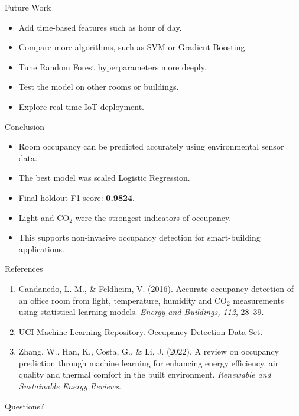 \documentclass[aspectratio=169,11pt]{beamer}
\begin{document}
\begin{frame}{Future Work}
    \begin{itemize}
        \item Add time-based features such as hour of day.
        \item Compare more algorithms, such as SVM or Gradient Boosting.
        \item Tune Random Forest hyperparameters more deeply.
        \item Test the model on other rooms or buildings.
        \item Explore real-time IoT deployment.
    \end{itemize}
\end{frame}

\begin{frame}{Conclusion}
    \begin{itemize}
        \item Room occupancy can be predicted accurately using environmental sensor data.
        \item The best model was scaled Logistic Regression.
        \item Final holdout F1 score: \textbf{0.9824}.
        \item Light and CO$_2$ were the strongest indicators of occupancy.
        \item This supports non-invasive occupancy detection for smart-building applications.
    \end{itemize}
\end{frame}

\begin{frame}{References}
    \small
    \begin{enumerate}
        \item Candanedo, L. M., \& Feldheim, V. (2016). Accurate occupancy detection of an office room from light, temperature, humidity and CO$_2$ measurements using statistical learning models. \textit{Energy and Buildings, 112}, 28--39.
        \item UCI Machine Learning Repository. Occupancy Detection Data Set.
        \item Zhang, W., Han, K., Costa, G., \& Li, J. (2022). A review on occupancy prediction through machine learning for enhancing energy efficiency, air quality and thermal comfort in the built environment. \textit{Renewable and Sustainable Energy Reviews}.
    \end{enumerate}
\end{frame}

\begin{frame}
    \centering
    \Huge Questions?
\end{frame}
\end{document}
